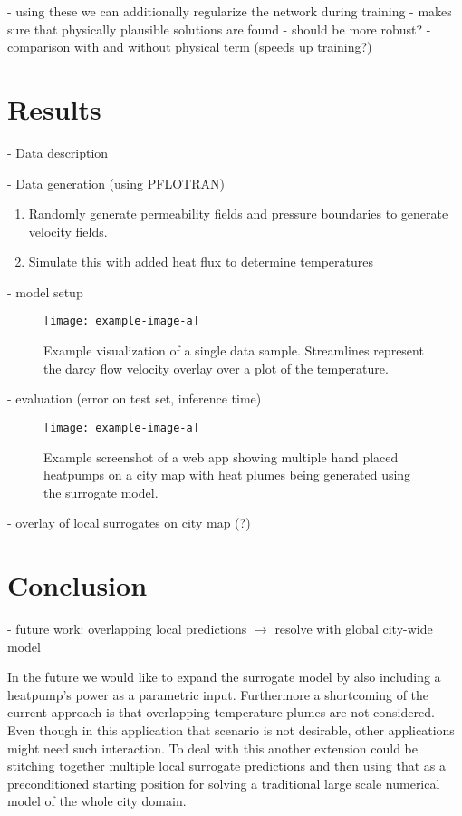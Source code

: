 \documentclass{article} %
\begin{document}
- using these we can additionally regularize the network during training
- makes sure that physically plausible solutions are found
- should be more robust?
- comparison with and without physical term (speeds up training?)



\section{Results}
\label{sec:results}

- Data description

- Data generation (using PFLOTRAN)
\begin{enumerate}
\item Randomly generate permeability fields and pressure boundaries to generate velocity fields.
\item Simulate this with added heat flux to determine temperatures
\end{enumerate}

- model setup
\begin{figure}[htb]
   \centering
   \texttt{[image: example-image-a]}
   \caption{Example visualization of a single data sample. Streamlines represent the darcy flow velocity overlay over a plot of the temperature.}
\end{figure}

- evaluation (error on test set, inference time)


\begin{figure}[htb]
   \centering
   \texttt{[image: example-image-a]}
   \caption{Example screenshot of a web app showing multiple hand placed heatpumps on a city map with heat plumes being generated using the surrogate model.}
\end{figure}
- overlay of local surrogates on city map (?)

\section{Conclusion}
\label{sec:conclusion}

- future work: overlapping local predictions $\rightarrow$ resolve with global city-wide model

In the future we would like to expand the surrogate model by also including a heatpump's power as a parametric input.
Furthermore a shortcoming of the current approach is that overlapping temperature plumes are not considered.
Even though in this application that scenario is not desirable, other applications might need such interaction.
To deal with this another extension could be stitching together multiple local surrogate predictions and then using that as a preconditioned starting position for solving a traditional large scale numerical model of the whole city domain.
\end{document}
